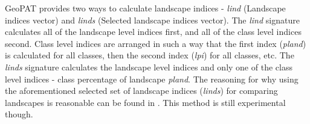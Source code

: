 GeoPAT provides two ways to calculate landscape indices - {\it lind} (Landscape indices vector) and {\it linds} (Selected landscape indices vector).
The {\it lind} signature calculates all of the landscape level indices first, and all of the class level indices second.
Class level indices are arranged in such a way that the first index ({\it pland}) is calculated for all classes, then the second index ({\it lpi}) for all classes, etc. 
The {\it linds} signature calculates the landscape level indices and only one of the class level indices - class percentage of landscape {\it pland}. 
The reasoning for why using the aforementioned selected set of landscape indices ({\it linds}) for comparing landscapes is reasonable can be found in \cite{Niesterowicz2016EI}. 
This method is still experimental though.

% 
% 
% 
% 
% 
